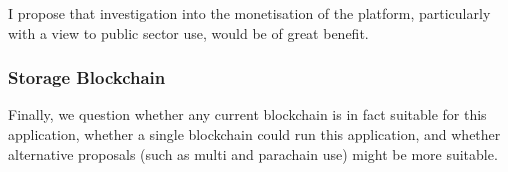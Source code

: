 I propose that investigation into the monetisation of the platform, particularly with a view to public sector use, would be of great benefit.

\subsubsection{Storage Blockchain}

Finally, we question whether any current blockchain is in fact suitable for this application, whether a single blockchain could run this application, and whether alternative proposals (such as multi and parachain use) might be more suitable.
